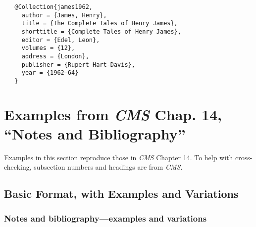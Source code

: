 \documentclass[11pt,letterpaper,oneside]{article}
\begin{document}
\begin{verbatim}
   @Collection{james1962,
     author = {James, Henry},
     title = {The Complete Tales of Henry James},
     shorttitle = {Complete Tales of Henry James},
     editor = {Edel, Leon},
     volumes = {12},
     address = {London},
     publisher = {Rupert Hart-Davis},
     year = {1962–64}
   }
\end{verbatim}

\section{Examples from \emph{CMS} Chap. 14, ``Notes and
Bibliography''}
\label{notes}

Examples in this section reproduce those in \textit{CMS} Chapter 14.
To help with cross-checking, subsection numbers and headings are from
\textit{CMS}.

\subsection{Basic Format, with Examples and Variations}
\setcounter{subsection}{14}

\setcounter{subsubsection}{22}
\subsubsection{Notes and bibliography—examples and variations}
\label{14.23}

\begin{citebib}
\item \cite[87-88]{strayed2012}
\item \cite[261, 265]{strayed2012}
\item \cite[32]{daum2015}
\item \cite[134--35]{daum2015}
\item \cite[188]{grazer2015}
\item \cite[190]{grazer2015}
\item \cite[242--55]{garcia1988}
\item \cite[33]{garcia1988}
\item \cite[310]{gould1984a}
\item \cite[309]{gould1984a}
\item \cite[484--85]{bagley2015}
\item \cite[501]{bagley2015}
\item \cite[311]{liu2015}
\item \cite[312]{liu2015}
\end{citebib}
\end{document}
